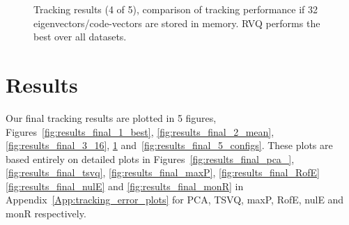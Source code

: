 								\begin{figure}[t]
								\centering
								
								\caption{Tracking results (4 of 5), comparison of tracking performance if 32 eigenvectors/code-vectors are stored in memory.  RVQ performs the best over all datasets.}
								\label{fig:results_final_4_32}
								\end{figure}

\section{Results}
Our final tracking results are plotted in 5 figures, Figures~\ref{fig:results_final_1_best}, \ref{fig:results_final_2_mean}, \ref{fig:results_final_3_16}, \ref{fig:results_final_4_32} and~\ref{fig:results_final_5_configs}.  These plots are based entirely on detailed plots in Figures~\ref{fig:results_final_pca_}, \ref{fig:results_final_tsvq}, \ref{fig:results_final_maxP}, \ref{fig:results_final_RofE} \ref{fig:results_final_nulE} and \ref{fig:results_final_monR} in Appendix~\ref{App:tracking_error_plots} for PCA, TSVQ, maxP, RofE, nulE and monR respectively.

